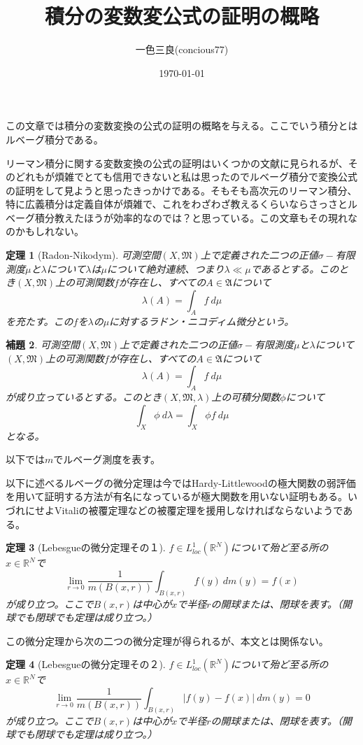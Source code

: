 \documentclass[leqno]{jsarticle}
\title{積分の変数変公式の証明の概略}
\author{一色三良(concious77)}
\date{\today}
\newtheorem{thm}{定理}
\newtheorem{lem}[thm]{補題}
\newcommand{\rr}{\mathbb{R}}
\newcommand{\la}{\lambda}
\begin{document}
\maketitle
この文章では積分の変数変換の公式の証明の概略を与える。ここでいう積分とはルベーグ積分である。\par
リーマン積分に関する変数変換の公式の証明はいくつかの文献に見られるが、そのどれもが煩雑でとても信用できないと私は思ったのでルベーグ積分で変換公式の証明をして見ようと思ったきっかけである。そもそも高次元のリーマン積分、特に広義積分は定義自体が煩雑で、これをわざわざ教えるくらいならさっさとルベーグ積分教えたほうが効率的なのでは？と思っている。この文章もその現れなのかもしれない。
\begin{thm}[Radon-Nikodym]
可測空間$(X,\mathfrak{M})$上で定義された二つの正値$\sigma-$有限測度$\mu$と$\la$について$\la$は$\mu$について絶対連続、つまり$\la\ll \mu$であるとする。このとき$(X,\mathfrak{M})$上の可測関数$f$が存在し、すべての$A\in \mathfrak{A}$について
\[
\la(A)=\int_Af\ d\mu
\]
を充たす。この$f$を$\la$の$\mu$に対するラドン・ニコディム微分という。
\end{thm}

\begin{lem}\label{ho}
可測空間$(X,\mathfrak{M})$上で定義された二つの正値$\sigma-$有限測度$\mu$と$\la$について$(X,\mathfrak{M})$上の可測関数$f$が存在し、すべての$A\in \mathfrak{A}$について
\[
\la(A)=\int_Af\ d\mu
\]が成り立っているとする。このとき$(X,\mathfrak{M},\la)$上の可積分関数$\phi$について
\[
\int_{X}\phi\ d\la=\int_{X}\phi f\ d\mu
\]
となる。
\end{lem}

以下では$m$でルベーグ測度を表す。\par
以下に述べるルベーグの微分定理は今ではHardy-Littlewoodの極大関数の弱評価を用いて証明する方法が有名になっているが極大関数を用いない証明もある。いづれにせよVitaliの被覆定理などの被覆定理を援用しなければならないようである。
\begin{thm}[Lebesgueの微分定理その１]\label{les}
$f\in L_{loc}^1(\rr^N)$について殆ど至る所の$x\in \rr^N$で
\[
\lim_{r\to 0}\frac{1}{m(B(x,r))}\int_{B(x,r)}f(y)\ dm(y)=f(x)
\]
が成り立つ。ここで$B(x,r)$は中心が$x$で半径$r$の開球または、閉球を表す。（開球でも閉球でも定理は成り立つ。）
\end{thm}
この微分定理から次の二つの微分定理が得られるが、本文とは関係ない。


\begin{thm}[Lebesgueの微分定理その２]
$f\in L_{loc}^1(\rr^N)$について殆ど至る所の$x\in \rr^N$で
\[
\lim_{r\to 0}\frac{1}{m(B(x,r))}\int_{B(x,r)}|f(y)-f(x)|\ dm(y)=0
\]
が成り立つ。ここで$B(x,r)$は中心が$x$で半径$r$の開球または、閉球を表す。（開球でも閉球でも定理は成り立つ。）
\end{thm}
\end{document}
